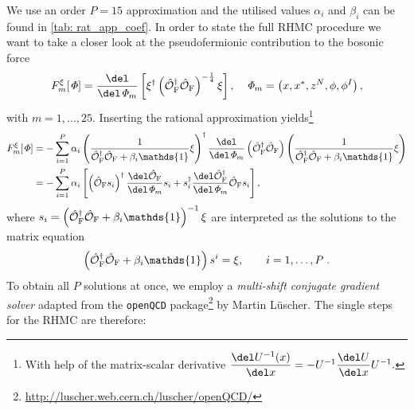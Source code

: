 %
%
We use an order $P=15$ approximation and the utilised values $\alpha_{i}$ and $\beta_{i}$ can be found in \autoref{tab: rat_app_coef}. In order to state the full RHMC procedure we want to take  a closer look at the pseudofermionic contribution to the bosonic force
%
%
\begin{equation}
F_{m}^{\xi}[\mathit{\Phi}] = \frac{\del }{\del \mathit{\Phi}_{m}}\left[ \xi^{\dagger}\left(\hat{\mathcal{O}}_{\rm F}^{\dagger}\hat{\mathcal{O}}_{\rm F}\right)^{-\frac{1}{4}} \xi \right], \quad \mathit{\Phi}_{m} = \left(x,x^{*},z^{N},\phi,\phi^{I}\right),
\end{equation}
%
%
with $ m=1,\ldots,25$. Inserting the rational approximation yields\footnote{With help of the matrix-scalar derivative 
$\dfrac{\del U^{-1}(x)}{\del x} = -U^{-1}\dfrac{\del U}{\del x} U^{-1}.$ \vspace{0.2cm}}
%
%
\begin{equation}
\begin{alignedat}{2}
F_{m}^{\xi}[\mathit{\Phi}] &= - \sum\limits_{i=1}^{P} \alpha_{i} \left(\frac{1}{\hat{\mathcal{O}}_{\rm F}^{\dagger}\hat{\mathcal{O}}_{\rm F}+\beta_{i}\mathds{1}} \xi \right)^{\dagger} \frac{\del }{\del \mathit{\Phi}_{m}}\left(\hat{\mathcal{O}}_{\rm F}^{\dagger}\hat{\mathcal{O}}_{\rm F}\right) \left(\frac{1}{\hat{\mathcal{O}}_{\rm F}^{\dagger}\hat{\mathcal{O}}_{\rm F}+\beta_{i}\mathds{1}} \xi \right) \\
%
%
&= -\sum\limits_{i=1}^{P} \alpha_{i}\left[ \left(\hat{\mathcal{O}}_{\rm F} s_{i}\right)^{\dagger} \frac{\del \hat{\mathcal{O}}_{\rm F}}{\del \mathit{\Phi}_{m}} s_{i} + s_{i}^{\dagger} \frac{\del \hat{\mathcal{O}}_{\rm F}^{\dagger}}{\del \mathit{\Phi}_{m}} \hat{\mathcal{O}}_{\rm F} s_{i} \right],
\end{alignedat}
\end{equation}
%
%
where $s_{i}= \left(\hat{\mathcal{O}}_{\rm F}^{\dagger}\hat{\mathcal{O}}_{\rm F}+\beta_{i}\mathds{1}\right)^{-1}\xi$ are interpreted as the solutions to the matrix equation
%
%
\begin{equation}
\left(\hat{\mathcal{O}}_{\rm F}^{\dagger}\hat{\mathcal{O}}_{\rm F}+\beta_{i}\mathds{1}\right) s^{i} = \xi, \qquad i=1,\ldots,P \;.
\label{eq: mscg}
\end{equation}
%
%
To obtain all $P$ solutions at once, we employ a \textit{multi-shift conjugate gradient solver} adapted from the \texttt{openQCD} package\footnote{\url{http://luscher.web.cern.ch/luscher/openQCD/}} by Martin Lüscher. The single steps for the RHMC are therefore:
%
%
